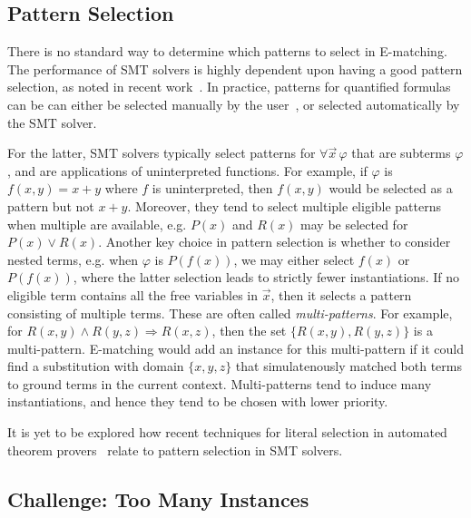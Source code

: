 \documentclass[oribibl]{llncs}
\begin{document}
\subsection{Pattern Selection}
There is no standard way to determine which patterns to select in E-matching.
The performance of SMT solvers is highly dependent upon having a good pattern selection, as noted in recent work~\cite{}.
In practice, patterns for quantified formulas can be can either be selected manually by the user~\cite{},
or selected automatically by the SMT solver.

For the latter, SMT solvers typically select patterns for $\forall \vec x\, \varphi$ that are subterms $\varphi$,
and are applications of uninterpreted functions.
For example, if $\varphi$ is $f( x, y ) = x + y$ where $f$ is uninterpreted, then $f( x, y )$ would be selected as a pattern
but not $x + y$.
Moreover, they tend to select multiple eligible patterns when multiple are available, 
e.g. $P( x )$ and $R( x )$ may be selected for $P( x ) \vee R( x )$.
Another key choice in pattern selection is whether to consider nested terms, e.g. when $\varphi$ is $P( f( x ) )$,
we may either select $f( x )$ or $P( f( x ) )$, where the latter selection leads to strictly fewer instantiations.
If no eligible term contains all the free variables in $\vec x$, then it selects a pattern consisting of multiple terms.
These are often called \emph{multi-patterns}.
For example, for $R( x, y ) \wedge R( y, z ) \Rightarrow R( x, z )$, then the set $\{ R( x, y ), R( y, z ) \}$ is a multi-pattern.
E-matching would add an instance for this multi-pattern if it could find a substitution with domain $\{ x, y, z \}$
that simulatenously matched both terms to ground terms in the current context.
Multi-patterns tend to induce many instantiations, and hence they tend to be chosen with lower priority.

It is yet to be explored how recent techniques for literal selection in automated theorem provers~\cite{}
relate to pattern selection in SMT solvers.

\subsection{Challenge: Too Many Instances}
\end{document}
